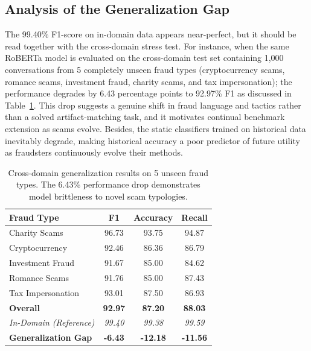 \documentclass{article}
\newcommand{\crchange}[1]{{\color{blue}#1}}
\begin{document}
\subsection{Analysis of the Generalization Gap}

\crchange{The 99.40\% F1-score on in-domain data appears near-perfect, but it should be read together with the cross-domain stress test.} For instance, when the same RoBERTa model is evaluated on the cross-domain test set containing 1,000 conversations from 5 completely unseen fraud types (cryptocurrency scams, romance scams, investment fraud, charity scams, and tax impersonation); the performance degrades by 6.43 percentage points to 92.97\% F1 as discussed in Table~\ref{tab:cross_domain}. \crchange{This drop suggests a genuine shift in fraud language and tactics rather than a solved artifact-matching task, and it motivates continual benchmark extension as scams evolve.} Besides, the static classifiers trained on historical data inevitably degrade, making historical accuracy a poor predictor of future utility as fraudsters continuously evolve their methods. 

\begin{table}[t]
\centering
\caption{Cross-domain generalization results on 5 unseen fraud types. The 6.43\% performance drop demonstrates model brittleness to novel scam typologies.}
\label{tab:cross_domain}
\begin{tabular}{@{}lccc@{}}
\toprule
Fraud Type & F1 & Accuracy & Recall \\ \midrule
Charity Scams & 96.73 & 93.75 & 94.87 \\
Cryptocurrency & 92.46 & 86.36 & 86.79 \\
Investment Fraud & 91.67 & 85.00 & 84.62 \\
Romance Scams & 91.76 & 85.00 & 87.43 \\
Tax Impersonation & 93.01 & 87.50 & 86.93 \\
\midrule
\textbf{Overall} & \textbf{92.97} & \textbf{87.20} & \textbf{88.03} \\
\midrule
\textit{In-Domain (Reference)} & \textit{99.40} & \textit{99.38} & \textit{99.59} \\
\textbf{Generalization Gap} & \textbf{-6.43} & \textbf{-12.18} & \textbf{-11.56} \\
\bottomrule
\end{tabular}
\end{table}
\end{document}

